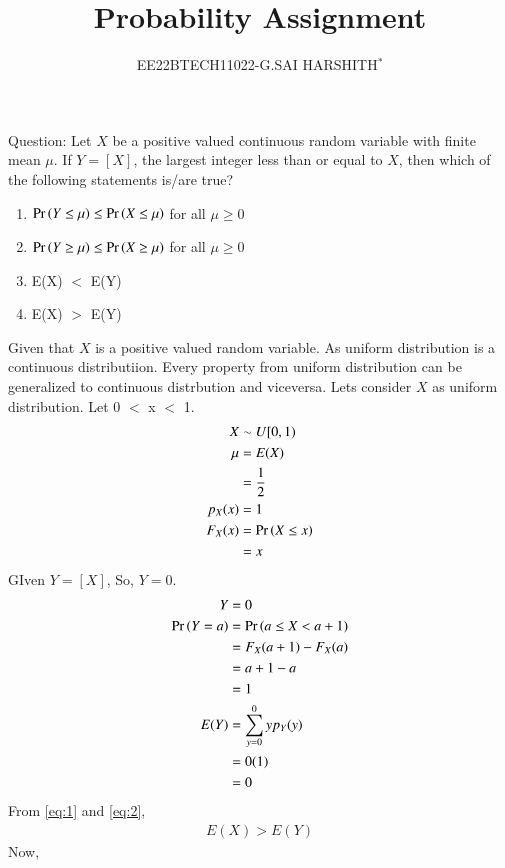 \documentclass[journal,12pt,twocolumn]{IEEEtran}
\theoremstyle{remark}
\begin{document}

\vspace{3cm}

\title{Probability Assignment}
\author{EE22BTECH11022-G.SAI HARSHITH$^{*}$%
}
\maketitle
\newpage
\bigskip
\renewcommand{\thefigure}{\theenumi}
\renewcommand{\thetable}{\theenumi}

Question: Let $X$ be a positive valued continuous random variable with finite mean $\mu$.
If $Y=[X]$, the largest integer less than or equal to $X$, then which of the
following statements is/are true?
\begin{enumerate}[label=(\Alph*)]
\item $\Pr\left(Y \leq \mu\right) \leq \Pr\left(X \leq \mu\right)$ for all $\mu \geq 0$
\item $\Pr\left(Y \geq \mu\right) \leq \Pr\left(X \geq \mu\right)$ for all $\mu \geq 0$
\item E(X) $<$ E(Y)
\item E(X) $>$ E(Y)
\end{enumerate}
\solution Given that $X$ is a positive valued random variable. As uniform distribution is a continuous distributiion. Every property from uniform distribution can be generalized to continuous distrbution and viceversa. Lets consider $X$ as uniform distribution. Let 0 $<$ x $<$ 1.
\begin{align}
X &\sim U[0,1)\\
\mu&=E(X)\\
&=\frac{1}{2}
\label{eq:1}\\
p_X(x)&=1\\
F_X(x)&=\Pr\left(X \leq x\right)\\
&=x
\end{align}
GIven $Y=[X]$, So, $Y=0$.
\begin{align}
Y&=0\\
\Pr\left(Y=a\right)&=\Pr\left(a \leq X <a+1\right)\\
&=F_X(a+1)-F_X(a)\\
&=a+1-a\\
&=1\\
E(Y)&=\sum^0_{y=0} y p_Y(y)\\
&=0(1)\\
&=0
\label{eq:2}
\end{align}
From \eqref{eq:1} and \eqref{eq:2},
\begin{align}
E(X) > E(Y)
\end{align}
Now,
\end{document}

